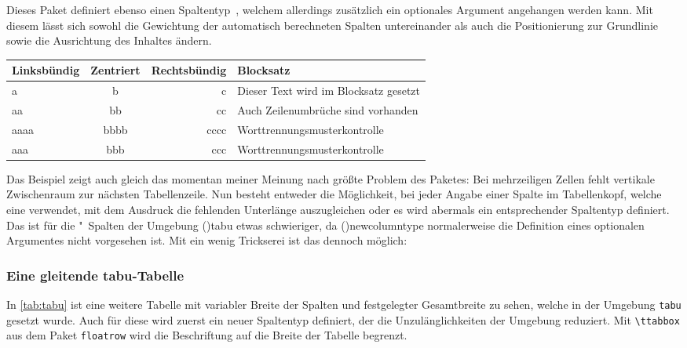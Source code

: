 \documentclass[%
  english,ngerman,%
  cdgeometry=no,DIV=12,%
  cd=false,cdfont=false,cdtitle=true,%
  headings=normal,%
  automark,%
  listof=toc,%
]{tudscrartcl}
\makeatletter
\newcommand*\pcolumnfuzz[1]{\pretocmd\@endpbox{\hfuzz=#1}{}{}}
\makeatother
\begin{document}
Dieses Paket definiert ebenso einen Spaltentyp~, welchem allerdings 
zusätzlich ein optionales Argument angehangen werden kann. Mit diesem lässt 
sich sowohl die Gewichtung der automatisch berechneten Spalten untereinander 
als auch die Positionierung zur Grundlinie sowie die Ausrichtung des Inhaltes 
ändern.
%
\begingroup
\pcolumnfuzz{70pt}
\CodeHook{\endgraf\null}
\begin{Hint*}
\begin{tabu} to 11.7cm {lcrX}
\toprule
\textbf{Linksbündig} & \textbf{Zentriert} & 
\textbf{Rechtsbündig} & \textbf{Blocksatz} \tabularnewline\midrule
a    & b    & c    & Dieser Text wird im Blocksatz gesetzt\tabularnewline
aa   & bb   & cc   & Auch Zeilenumbrüche sind vorhanden\tabularnewline
aaaa & bbbb & cccc & Worttrennungsmus\-terkontrolle\tabularnewline
aaa  & bbb  & ccc  & Worttrennungsmusterkontrolle
\tabularnewline\bottomrule
\end{tabu}
\end{Hint*}
\endgroup
%
Das Beispiel zeigt auch gleich das momentan meiner Meinung nach größte Problem 
des Paketes: Bei mehrzeiligen Zellen fehlt vertikale Zwischenraum zur nächsten 
Tabellenzeile. Nun besteht entweder die Möglichkeit, bei jeder Angabe einer 
Spalte im Tabellenkopf, welche eine  verwendet, mit dem Ausdruck 
 die fehlenden Unterlänge auszugleichen 
oder es wird abermals ein entsprechender Spaltentyp definiert. Das ist für 
die "~Spalten der Umgebung \Environment(){tabu} etwas 
schwieriger, da \Macro(){newcolumntype} normalerweise die 
Definition eines optionalen Argumentes nicht vorgesehen ist. Mit ein wenig 
Trickserei ist das dennoch möglich:
%
\begin{Trunk+}
\subsubsection{Eine gleitende tabu-Tabelle}

In \autoref{tab:tabu} ist eine weitere Tabelle mit variabler Breite der 
Spalten und festgelegter Gesamtbreite zu sehen, welche in der Umgebung 
\texttt{tabu} gesetzt wurde. Auch für diese wird zuerst ein neuer 
Spaltentyp definiert, der die Unzulänglichkeiten der Umgebung reduziert. 
Mit \texttt{\textbackslash ttabbox} aus dem Paket \texttt{floatrow} wird 
die Beschriftung auf die Breite der Tabelle begrenzt.

\end{Trunk+}
\CodeHook{\renewcommand*{\newcolumntype}[2]{}}
\end{document}
